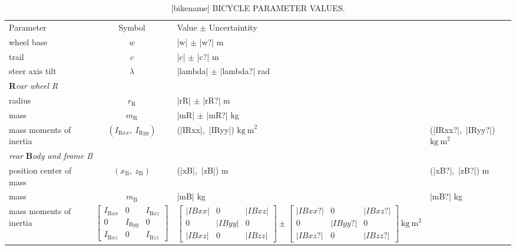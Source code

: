 \documentclass[../report/parameterReport.tex]{subfiles}
\begin{document}
\begin{table*}[tb]
\centering
\caption{|bikename| BICYCLE PARAMETER VALUES.}
\begin{tabular}{lcll}
&&\\
\hline
Parameter & Symbol & Value $\pm$ Uncertaintity \\
\hline
wheel base & $w$ & |w| $\pm$ |w?| m\\
trail & $c$ & |c| $\pm$ |c?| m\\
steer axis tilt & \emph{$\lambda$} & |lambda| $\pm$ |lambda?| rad \\

\multicolumn{3}{l}{\textbf{R}\emph{ear wheel R}}\\
radius & \emph{$r_\mathrm{R}$} & |rR| $\pm$ |rR?| m \\
mass & \emph{$m_\mathrm{R}$} & |mR| $\pm$ |mR?| kg\\
mass moments of inertia & \emph{$(I_{\mathrm{R}xx},\
I_{\mathrm{R}yy})$} &
(|IRxx|,\ |IRyy|) $\mathrm{kg\ m}^2$ & (|IRxx?|,\ |IRyy?|) $\mathrm{kg\ m}^2$ \\

\multicolumn{3}{l}{\emph{rear} \textbf{B}\emph{ody and frame B}}\\
position center of mass & \emph{$(x_\mathrm{B},\ z_\mathrm{B})$} &
(|xB|,\ |zB|) m & (|xB?|,\ |zB?|) m \\
mass & \emph{$m_\mathrm{B}$} & |mB| kg & |mB?| kg \\
mass moments of inertia & $\left[ \begin{array}{ccc}
I_{\mathrm{B}xx} &  0 & I_{\mathrm{B}xz}\\
0 & I_{\mathrm{B}yy} & 0 \\
I_{\mathrm{B}xz} & 0 & I_{\mathrm{B}zz}
\end{array} \right] $
&
$\left[ \begin{array}{ccc}
|IBxx| &  0 & |IBxz|\\
0 & |IByy| & 0 \\
|IBxz| & 0 & |IBzz|
\end{array} \right]
\pm
\left[ \begin{array}{ccc}
|IBxx?| &  0 & |IBxz?|\\
0 & |IByy?| & 0 \\
|IBxz?| & 0 & |IBzz?|
\end{array} \right] \ \mathrm{kg\ m}^{2}$\\


\end{tabular}
\end{table*}
\end{document}
